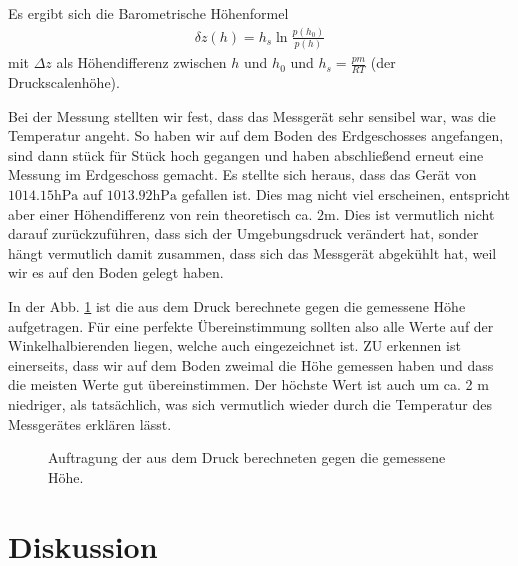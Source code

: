 \documentclass[12pt,a4paper,titlepage,headinclude,bibtotoc]{scrartcl}
\begin{document}
Es ergibt sich die Barometrische Höhenformel
\begin{align}
	\delta z(h)=h_s\ln\frac{p(h_0)}{p(h)}
\end{align}
mit $\Delta z$ als Höhendifferenz zwischen $h$ und $h_0$ und $h_s=\frac{pm}{RT}$ (der Druckscalenhöhe).

Bei der Messung stellten wir fest, dass das Messgerät sehr sensibel war, was die Temperatur angeht.
So haben wir auf dem Boden des Erdgeschosses angefangen, sind dann stück für Stück hoch gegangen und haben abschließend erneut eine Messung im Erdgeschoss gemacht.
Es stellte sich heraus, dass das Gerät von $1014.15\si{\hecto\pascal}$ auf $1013.92\si{\hecto\pascal}$ gefallen ist.
Dies mag nicht viel erscheinen, entspricht aber einer Höhendifferenz von rein theoretisch ca. $2\si\meter$.
Dies ist vermutlich nicht darauf zurückzuführen, dass sich der Umgebungsdruck verändert hat, sonder hängt vermutlich damit zusammen, dass sich das Messgerät abgekühlt hat, weil wir es auf den Boden gelegt haben.

In der Abb. \ref{fig:hoehe} ist die aus dem Druck berechnete gegen die gemessene Höhe aufgetragen.
Für eine perfekte Übereinstimmung sollten also alle Werte auf der Winkelhalbierenden liegen, welche auch eingezeichnet ist.
ZU erkennen ist einerseits, dass wir auf dem Boden zweimal die Höhe gemessen haben und dass die meisten Werte gut übereinstimmen.
Der höchste Wert ist auch um ca. 2 m niedriger, als tatsächlich, was sich vermutlich wieder durch die Temperatur des Messgerätes erklären lässt.


\begin{figure}[h]
	\centering
	
	\caption{Auftragung der aus dem Druck berechneten gegen die gemessene Höhe.}
	\label{fig:hoehe}
\end{figure}





\section{Diskussion}
\label{sec:diskussion}



\end{document}
